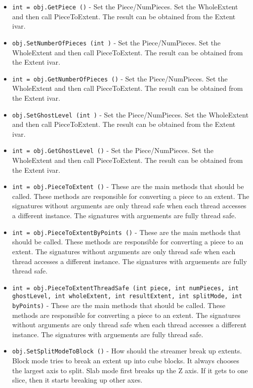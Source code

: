 \begin{itemize}
\item  \verb|int = obj.GetPiece ()| -  Set the Piece/NumPieces. Set the WholeExtent and then call PieceToExtent.
 The result can be obtained from the Extent ivar.

\item  \verb|obj.SetNumberOfPieces (int )| -  Set the Piece/NumPieces. Set the WholeExtent and then call PieceToExtent.
 The result can be obtained from the Extent ivar.

\item  \verb|int = obj.GetNumberOfPieces ()| -  Set the Piece/NumPieces. Set the WholeExtent and then call PieceToExtent.
 The result can be obtained from the Extent ivar.

\item  \verb|obj.SetGhostLevel (int )| -  Set the Piece/NumPieces. Set the WholeExtent and then call PieceToExtent.
 The result can be obtained from the Extent ivar.

\item  \verb|int = obj.GetGhostLevel ()| -  Set the Piece/NumPieces. Set the WholeExtent and then call PieceToExtent.
 The result can be obtained from the Extent ivar.

\item  \verb|int = obj.PieceToExtent ()| -  These are the main methods that should be called. These methods 
 are responsible for converting a piece to an extent. The signatures
 without arguments are only thread safe when each thread accesses a
 different instance. The signatures with arguements are fully thread
 safe. 

\item  \verb|int = obj.PieceToExtentByPoints ()| -  These are the main methods that should be called. These methods 
 are responsible for converting a piece to an extent. The signatures
 without arguments are only thread safe when each thread accesses a
 different instance. The signatures with arguements are fully thread
 safe. 

\item  \verb|int = obj.PieceToExtentThreadSafe (int piece, int numPieces, int ghostLevel, int wholeExtent, int resultExtent, int splitMode, int byPoints)| -  These are the main methods that should be called. These methods 
 are responsible for converting a piece to an extent. The signatures
 without arguments are only thread safe when each thread accesses a
 different instance. The signatures with arguements are fully thread
 safe. 

\item  \verb|obj.SetSplitModeToBlock ()| -  How should the streamer break up extents. Block mode
 tries to break an extent up into cube blocks.  It always chooses
 the largest axis to split.
 Slab mode first breaks up the Z axis.  If it gets to one slice,
 then it starts breaking up other axes.


\end{itemize}
